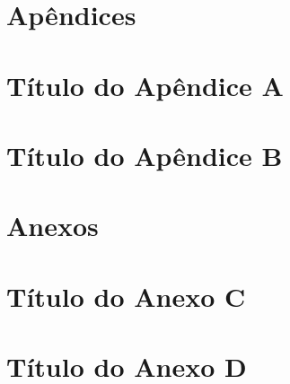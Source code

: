 \documentclass[12pt,a4paper,oneside]{memoir}
\begin{document}

\chapter*{Apêndices}
\chapter{Título do Apêndice A} %
\chapter{Título do Apêndice B} %


\chapter*{Anexos}
\chapter{Título do Anexo C} %
\chapter{Título do Anexo D} %
\end{document}
